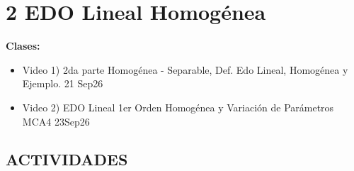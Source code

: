 \section{2 EDO Lineal Homogénea}

\begin{tcolorbox}[enunciado]
\textbf{Clases:}
\begin{itemize}[leftmargin=*]
    \item Video 1) 2da parte Homogénea - Separable, Def. Edo Lineal, Homogénea y Ejemplo. 21 Sep26
    \item Video 2) EDO Lineal 1er Orden Homogénea y Variación de Parámetros MCA4 23Sep26
\end{itemize}
\end{tcolorbox}

\subsection*{ACTIVIDADES}

